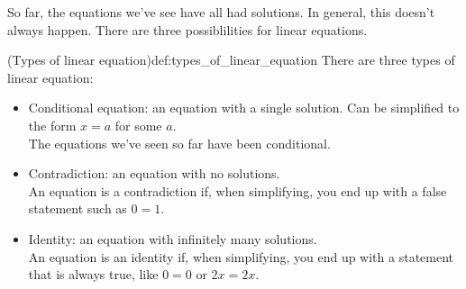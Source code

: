 \documentclass{article}
\begin{document}
So far, the equations we've see have all had solutions. In general, this doesn't always happen. There are three possiblilities for linear equations.
\begin{definition}{(Types of linear equation)}{def:types_of_linear_equation}
    There are three types of linear equation:
    \begin{itemize}
        \item Conditional equation: an equation with a single solution. Can be simplified to the form $x=a$ for some $a$.\\
        The equations we've seen so far have been conditional.
        \item Contradiction: an equation with no solutions.\\
        An equation is a contradiction if, when simplifying, you end up with a false statement such as $0=1$.
        \item Identity: an equation with infinitely many solutions.\\
        An equation is an identity if, when simplifying, you end up with a statement that is always true, like $0=0$ or $2x=2x$.
    \end{itemize}
\end{definition}
\end{document}
